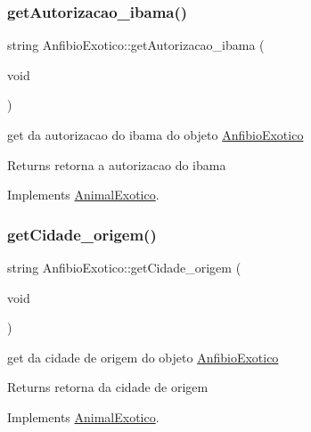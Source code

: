 \subsubsection{\texorpdfstring{getAutorizacao\_ibama()}{getAutorizacao\_ibama()}}
{\footnotesize\ttfamily string Anfibio\+Exotico\+::get\+Autorizacao\+\_\+ibama (\begin{DoxyParamCaption}\item[{void}]{ }\end{DoxyParamCaption})\hspace{0.3cm}{\ttfamily [virtual]}}



get da autorizacao do ibama do objeto \mbox{\hyperlink{class_anfibio_exotico}{Anfibio\+Exotico}} 

\begin{DoxyReturn}{Returns}
retorna a autorizacao do ibama 
\end{DoxyReturn}


Implements \mbox{\hyperlink{class_animal_exotico}{Animal\+Exotico}}.

\mbox{\label{class_anfibio_exotico_a283a954fe986d0cf350a32f4c85e5434}} 
\subsubsection{\texorpdfstring{getCidade\_origem()}{getCidade\_origem()}}
{\footnotesize\ttfamily string Anfibio\+Exotico\+::get\+Cidade\+\_\+origem (\begin{DoxyParamCaption}\item[{void}]{ }\end{DoxyParamCaption})\hspace{0.3cm}{\ttfamily [virtual]}}



get da cidade de origem do objeto \mbox{\hyperlink{class_anfibio_exotico}{Anfibio\+Exotico}} 

\begin{DoxyReturn}{Returns}
retorna da cidade de origem 
\end{DoxyReturn}


Implements \mbox{\hyperlink{class_animal_exotico}{Animal\+Exotico}}.

\mbox{\label{class_anfibio_exotico_ad775d02fe9a051357e95f6d97ad234bf}} 
